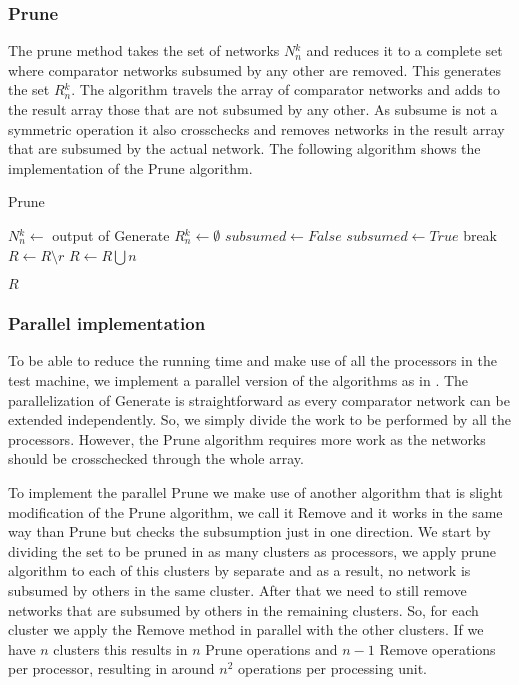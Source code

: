 \documentclass[../main.tex]{subfiles}
\begin{document}
	\subsubsection{Prune}
	The prune method takes the set of networks $N{_n^{k}}$ and reduces it to a complete set where comparator networks subsumed by any other are removed. This generates the set $R{_n^k}$. The algorithm travels the array of comparator networks and adds to the result array those that are not subsumed by any other. As subsume is not a symmetric operation it also crosschecks and removes networks in the result array that are subsumed by the actual network. The following algorithm shows the implementation of the Prune algorithm. 
	\begin{algorithm}[H]
		\caption{Prune} 
		\begin{algorithmic}
			\State $N{_n^k} \leftarrow$ output of Generate
			\State $R{_n^k} \leftarrow \emptyset$
			\State $subsumed \leftarrow False$
						\State $subsumed \leftarrow True$
						\State break
					\EndIf
						\State $R \leftarrow R \setminus r$
					\EndIf
				\EndFor
					\State $R \leftarrow R \bigcup n$
				\EndIf
			\EndFor
			
		\Return $R$
		\end{algorithmic}
	\end{algorithm}
	
	\subsubsection{Parallel implementation}
	To be able to reduce the running time and make use of all the processors in the test machine, we implement a parallel version of the algorithms as in \cite{sortingnineinputs}. The parallelization of Generate is straightforward as every comparator network can be extended independently. So, we simply divide the work to be performed by all the processors.
	However, the Prune algorithm requires more work as the networks should be crosschecked through the whole array.
	
	To implement the parallel Prune we make use of another algorithm that is slight modification of the Prune algorithm, we call it Remove and it works in the same way than Prune but checks the subsumption just in one direction. We start by dividing the set to be pruned in as many clusters as processors, we apply prune algorithm to each of this clusters by separate and as a result, no network is subsumed by others in the same cluster. After that we need to still remove networks that are subsumed by others in the remaining clusters. So, for each cluster we apply the Remove method in parallel with the other clusters. If we have $n$ clusters this results in $n$ Prune operations and $n - 1$ Remove operations per processor, resulting in around $n^2$ operations per processing unit.
	
\end{document}
